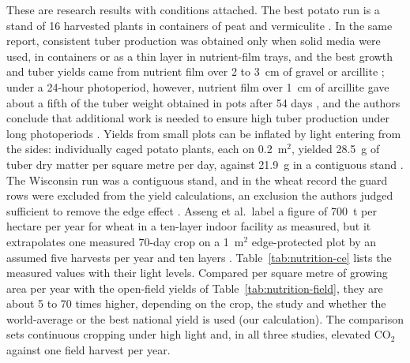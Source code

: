 These are research results with conditions attached. The best potato run is a stand of 16 harvested plants in containers of peat and vermiculite \cite[pp.~28--29]{tibbitts1994potato}. In the same report, consistent tuber production was obtained only when solid media were used, in containers or as a thin layer in nutrient-film trays, and the best growth and tuber yields came from nutrient film over 2 to 3~cm of gravel or arcillite \cite[p.~iv; p.~6]{tibbitts1994potato}; under a 24-hour photoperiod, however, nutrient film over 1~cm of arcillite gave about a fifth of the tuber weight obtained in pots after 54 days \cite[Table~2.5, p.~17]{tibbitts1994potato}, and the authors conclude that additional work is needed to ensure high tuber production under long photoperiods \cite[p.~19]{tibbitts1994potato}. Yields from small plots can be inflated by light entering from the sides: individually caged potato plants, each on 0.2~m$^2$, yielded 28.5~g of tuber dry matter per square metre per day, against 21.9~g in a contiguous stand \cite[p.~82]{wheeler2006potato}.%
 The Wisconsin run was a contiguous stand, and in the wheat record the guard rows were excluded from the yield calculations, an exclusion the authors judged sufficient to remove the edge effect \cite[Fig.~1, p.~871; p.~873]{bugbee1988limits}. Asseng et al.\ label a figure of 700~t per hectare per year for wheat in a ten-layer indoor facility as measured, but it extrapolates one measured 70-day crop on a 1~m$^2$ edge-protected plot by an assumed five harvests per year and ten layers \cite[Abstract and p.~1; Fig.~2, p.~2; p.~3]{asseng2020wheat}.%
 Table~\ref{tab:nutrition-ce} lists the measured values with their light levels. Compared per square metre of growing area per year with the open-field yields of Table~\ref{tab:nutrition-field}, they are about 5 to 70 times higher, depending on the crop, the study and whether the world-average or the best national yield is used (our calculation). The comparison sets continuous cropping under high light and, in all three studies, elevated CO$_2$ against one field harvest per year.

